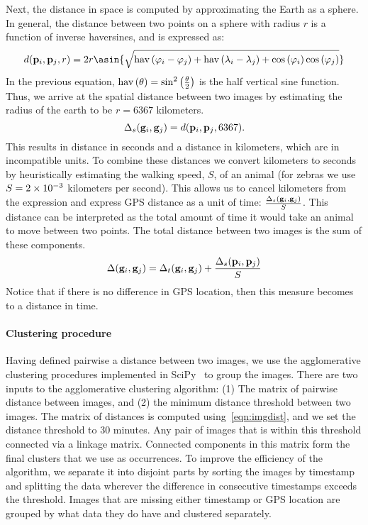 \begin{appendices}
    Next, the distance in space is computed by approximating the Earth as a sphere.
    In general, the distance between two points on a sphere with radius $r$ is a function of inverse haversines,
      and is expressed as:
    \begin{equation}\label{eqn:geodistance}
        d(\gps_i, \gps_j, r) =
        2 r \asin{\sqrt{
            \haversine{\lat_i - \lat_j} +
            \haversine{\lon_i - \lon_j} +
            \cos\paren{\lat_i} \cos\paren{\lat_j}}}
    \end{equation}
    In the previous equation, $\mathbin{\operatorname{hav}}\left(\theta\right) = \sin^{2}\left(\frac{\theta}{2}\right)$ is the half vertical sine function.
    Thus, we arrive at the spatial distance between two images by estimating the radius of the earth to be
      $r=6367$ kilometers.
    \begin{equation}
        \Delta_s(\mathbf{g}_i, \mathbf{g}_j) = d(\mathbf{p}_i, \mathbf{p}_j, 6367).
    \end{equation}
    This results in distance in seconds and a distance in kilometers, which are in incompatible units.
    To combine these distances we convert kilometers to seconds by heuristically estimating the walking speed,
      $S$, of an animal (for zebras we use $S=2\times 10^{-3}$ kilometers per second).
    This allows us to cancel kilometers from the expression and express GPS distance as a unit of time:
    $\frac{\Delta_s(\mathbf{g}_i, \mathbf{g}_j)}{S}$.
    This distance can be interpreted as the total amount of time it would take an animal to move between two
      points.
    The total distance between two images is the sum of these components.
    \begin{equation}\label{eqn:imgdist}
        \Delta(\mathbf{g}_i, \mathbf{g}_j) = \Delta_t(\mathbf{g}_i, \mathbf{g}_j) + \frac{\Delta_s(\mathbf{p}_i, \mathbf{p}_j)}{S}
    \end{equation}
    Notice that if there is no difference in GPS location, then this measure
      becomes to a distance in time.

    \paragraph{Clustering procedure}
    Having defined pairwise a distance between two images, we use the agglomerative clustering procedures
      implemented in SciPy~\cite{eric_jones_scipy_2001} to group the images.
    There are two inputs to the agglomerative clustering algorithm:
    (1) The matrix of pairwise distance between images, and
    (2) the minimum distance threshold between two images.
    The matrix of distances is computed using~\cref{eqn:imgdist}, and we set the distance threshold to $30$
      minutes.
    Any pair of images that is within this threshold connected via a linkage matrix.
    Connected components in this matrix form the final clusters that we use as occurrences{}.
    To improve the efficiency of the algorithm, we separate it into disjoint parts by sorting the images by
      timestamp and splitting the data wherever the difference in consecutive timestamps exceeds the threshold.
    Images that are missing either timestamp or GPS location are grouped by what data they do have and clustered
      separately.


\end{appendices}
